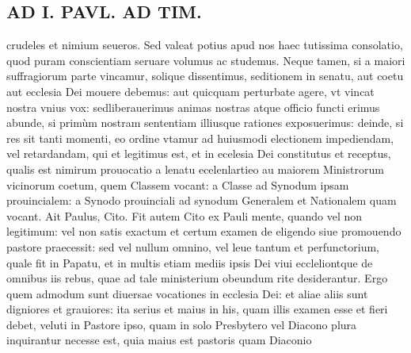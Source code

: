 \documentclass{article}
\begin{document}
\begin{pages}
\section*{AD I. PAVL. AD TIM. }
\marginpar{[ p.340 ]}\pstart crudeles et nimium seueros. Sed valeat potius apud nos haec tutissima consolatio, quod puram conscientiam seruare volumus ac studemus. Neque tamen, si a maiori suffragiorum parte vincamur, solique dissentimus, seditionem in senatu, aut coetu aut ecclesia Dei mouere debemus: aut quicquam perturbate agere, vt vincat nostra vnius vox: sedliberauerimus animas nostras atque officio functi erimus abunde, si primùm nostram sententiam illiusque rationes exposuerimus: deinde, si res sit tanti momenti, eo ordine vtamur ad huiusmodi electionem impediendam, vel retardandam, qui et legitimus est, et in ecelesia Dei constitutus et receptus, qualis est nimirum prouocatio a lenatu ecelenlartieo au maiorem Ministrorum vicinorum coetum, quem Classem vocant: a Classe ad Synodum ipsam prouincialem: a Synodo prouinciali ad synodum Generalem et Nationalem quam vocant.  \pend\pstart Ait Paulus, Cito. Fit autem Cito ex Pauli mente, quando vel non legitimum: vel non satis exactum et certum examen de eligendo siue promouendo pastore praecessit: sed vel nullum omnino, vel leue tantum et perfunctorium, quale fit in Papatu, et in multis etiam mediis ipsis Dei viui eccleliontque de omnibus iis rebus, quae ad tale ministerium obeundum rite desiderantur. Ergo quem admodum sunt diuersae vocationes in ecclesia Dei: et aliae aliis sunt digniores et grauiores: ita serius et maius in his, quam illis examen esse et fieri debet, veluti in Pastore ipso, quam in solo Presbytero vel Diacono plura inquirantur necesse est, quia maius est pastoris quam Diaconio\pend

\end{pages}
\end{document}
